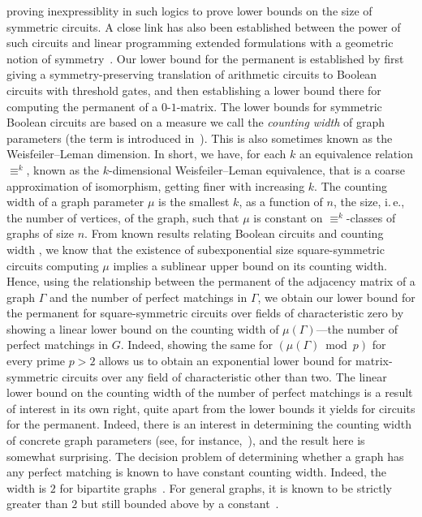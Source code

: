 \documentclass[11pt]{article}
\newcommand{\ie}{i.\,e.}
\begin{document}
proving inexpressiblity in such logics to prove lower bounds on the size of
symmetric circuits. A close link has also been established between the power of
such circuits and linear programming extended formulations with a geometric
notion of symmetry~\cite{AtseriasDO19}. Our lower bound for the permanent is
established by first giving a symmetry-preserving translation of arithmetic
circuits to Boolean circuits with threshold gates, and then establishing a lower
bound there for computing the permanent of a $0$-$1$-matrix.
The lower bounds for symmetric Boolean circuits are based on a measure we call
the \emph{counting width} of graph parameters (the term is introduced
in~\cite{DawarW17}). This is also sometimes known as the Weisfeiler--Leman
dimension. In short, we have, for each $k$ an equivalence relation $\equiv^k$,
known as the $k$-dimensional Weisfeiler--Leman equivalence, that is a coarse
approximation of isomorphism, getting finer with increasing $k$. The counting
width of a graph parameter $\mu$ is the smallest $k$, as a function of
%
%
$n$, the size, \ie, the number of vertices, of the graph,  %
%
%
%
%
such that $\mu$ is constant on $\equiv^k$-classes of graphs of size
$n$. From known results relating Boolean circuits and counting
width \cite{AndersonD17,AtseriasDO19}, we know that the existence of
subexponential size square-symmetric circuits computing $\mu$ implies a sublinear upper
bound on its counting width.  Hence, using the relationship between the
permanent of the adjacency matrix of a graph $\Gamma$ and the number of
perfect matchings in $\Gamma$, we obtain our lower bound for the permanent
for square-symmetric circuits over fields of characteristic zero by showing a
linear lower bound on the counting width of $\mu(\Gamma)$---the number of perfect
matchings in $G$. Indeed, showing the same for $(\mu(\Gamma) \bmod p)$ for every
prime $p > 2$ allows us to obtain an exponential lower bound for
matrix-symmetric circuits over any field of characteristic other than two.
The linear lower bound on the counting width of the number of perfect matchings
is a result of interest in its own right, quite apart from the lower bounds it
yields for circuits for the permanent. Indeed, there is an interest in
determining the counting width of concrete graph parameters (see, for
instance,~\cite{ArvindFKV19}), and the result here is somewhat surprising. The
decision problem of determining whether a graph has any perfect matching is
known to have constant counting width. Indeed, the width is $2$ for bipartite
graphs~\cite{BlassGS02}. For general graphs, it is known to be strictly greater
than $2$ but still bounded above by a constant~\cite{AndersonDH15}.
\end{document}
